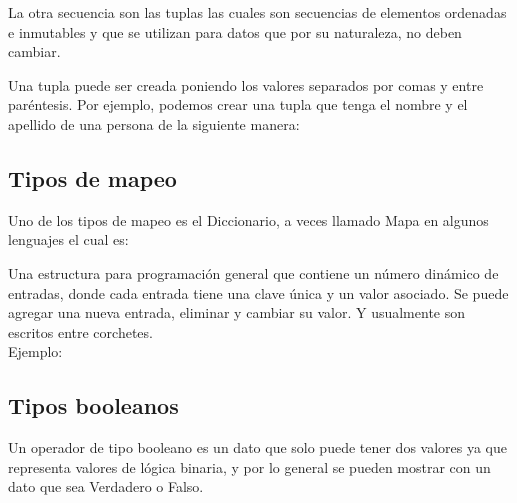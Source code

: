 La otra secuencia son las tuplas las cuales son secuencias de elementos ordenadas e inmutables y que se utilizan para datos que por su naturaleza, no deben cambiar.

Una tupla puede ser creada poniendo los valores separados por comas y entre paréntesis. Por ejemplo, podemos crear una tupla que tenga el nombre y el apellido de una persona de la siguiente manera:

\subsection{Tipos de mapeo}
Uno de los tipos de mapeo es el Diccionario, a veces llamado Mapa en algunos lenguajes el cual es:

Una estructura para programación general que contiene un número dinámico de entradas, donde cada entrada tiene una clave única y un valor asociado.
Se puede agregar una nueva entrada, eliminar y cambiar su valor. Y usualmente son escritos entre corchetes.\\

Ejemplo:

\subsection{Tipos booleanos}

Un operador de tipo booleano es un dato que solo puede tener dos valores ya que representa valores de lógica binaria, y por lo general se pueden mostrar con un dato que sea Verdadero o Falso.
